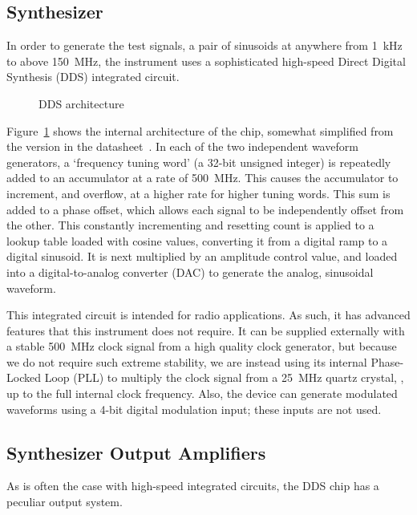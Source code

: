 \subsection{Synthesizer}


In order to generate the test signals, a pair of sinusoids at anywhere from
1~kHz to above 150~MHz, the instrument uses a sophisticated
high-speed Direct Digital Synthesis (DDS) integrated circuit.

\begin{figure}[H]
\centering
{}
\caption{DDS architecture}
\label{fig:dds}
\end{figure}

Figure~\ref{fig:dds} shows the internal architecture of the chip, somewhat
simplified from the version in the datasheet~\cite{ad9958}. In each of the two
independent waveform generators, a `frequency tuning word' (a 32-bit unsigned
integer) is repeatedly added to an accumulator at a rate of 500~MHz.
This causes the accumulator to increment, and overflow, at a higher rate for
higher tuning words. This sum is added to a phase offset, which allows each
signal to be independently offset from the other. This constantly incrementing
and resetting count is applied to a lookup table loaded with cosine values,
converting it from a digital ramp to a digital sinusoid. It is next multiplied
by an amplitude control value, and loaded into a digital-to-analog converter
(DAC) to generate the analog, sinusoidal waveform.

This integrated circuit is intended for radio applications. As such, it has
advanced features that this instrument does not require. It can be supplied
externally with a stable 500~MHz clock signal from a high quality
clock generator, but because we do not require such extreme stability, we
are instead using its internal Phase-Locked Loop (PLL) to multiply the clock
signal from a 25~MHz quartz crystal, , up to the full
internal clock frequency. Also, the device can generate modulated waveforms
using a 4-bit digital modulation input; these inputs are not used.

\subsection{Synthesizer Output Amplifiers}

As is often the case with high-speed integrated circuits, the DDS chip has a
peculiar output system.

